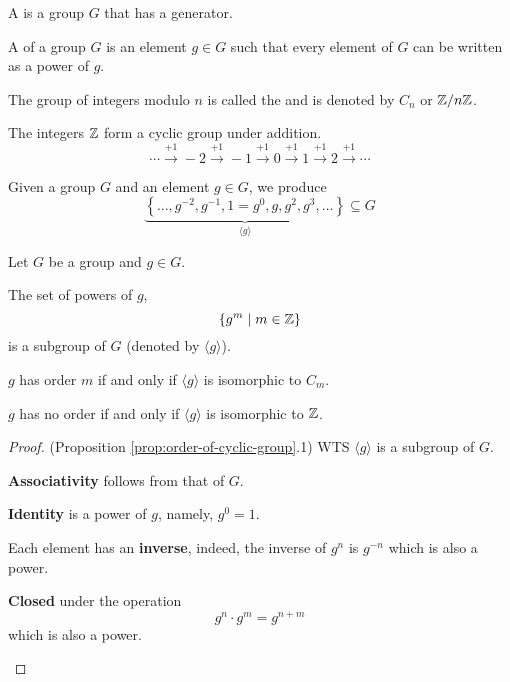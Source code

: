 \begin{definition}\label{def:cyclic-group}
    A  is a group $G$ that has a generator. 
\end{definition}

\begin{definition}[Generator]\label{def:generator}
    A  of a group $G$ is an element $g \in G$ such that every element of $G$ can be written as a power of $g$.
\end{definition}

The group of integers modulo $n$ is called the  and is denoted by $C_n$ or $\mathbb{Z}/n\mathbb{Z}$.

\begin{example}
    The integers $\mathbb{Z}$ form a cyclic group under addition. \[ 
        \cdots \xrightarrow{+1} -2 \xrightarrow{+1} -1 \xrightarrow{+1} 0 \xrightarrow{+1} 1 \xrightarrow{+1} 2 \xrightarrow{+1} \cdots 
    \]
\end{example}

Given a group $G$ and an element $g \in G$, we produce \[
    \underbrace{\left\{ \dots, g^{-2}, g^{-1}, 1 = g^0, g, g^2, g^3, \dots \right\}}_{\langle g \rangle} \subseteq G
\]

\begin{proposition}\label{prop:order-of-cyclic-group}
    Let $G$ be a group and $g \in G$. 

    \begin{listo}
        \item The set of powers of $g$, \[
            \left\{ g^m \mid m \in \mathbb{Z} \right\}
        \] is a subgroup of $G$ (denoted by $\langle g \rangle$).

        \item $g$ has order $m$ if and only if $\langle g \rangle$ is isomorphic to $C_m$.
        
        \item $g$ has no order if and only if $\langle g \rangle$ is isomorphic to $\mathbb{Z}$.
    \end{listo}
\end{proposition}

\begin{proof}(Proposition \ref{prop:order-of-cyclic-group}.1)
    WTS $\langle g \rangle$ is a subgroup of $G$.

    \begin{listu}
        \item \textbf{Associativity} follows from that of $G$. 

        \item \textbf{Identity} is a power of $g$, namely, $g^0 = 1$.

        \item Each element has an \textbf{inverse}, indeed, the inverse of $g^n$ is $g^{-n}$ which is also a power. 

        \item \textbf{Closed} under the operation \[
            g^n \cdot g^m = g^{n + m}
        \] which is also a power. 
    \end{listu}
\end{proof}

